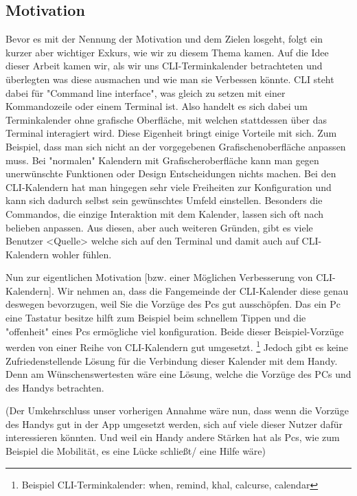 \subsection{Motivation}

Bevor es mit der Nennung der Motivation und dem Zielen losgeht, folgt ein kurzer aber wichtiger Exkurs, wie wir zu diesem Thema kamen. \newline
Auf die Idee dieser Arbeit kamen wir, als wir uns CLI-Terminkalender betrachteten und überlegten was diese ausmachen und wie man sie Verbessen könnte. CLI steht dabei für "Command line interface", was gleich zu setzen mit einer Kommandozeile oder einem Terminal ist. Also handelt es sich dabei um Terminkalender ohne grafische Oberfläche, mit welchen stattdessen über das Terminal interagiert wird. \newline
Diese Eigenheit bringt einige Vorteile mit sich. Zum Beispiel, dass man sich nicht an der vorgegebenen Grafischenoberfläche anpassen muss. Bei "normalen" Kalendern mit Grafischeroberfläche kann man gegen unerwünschte Funktionen oder Design Entscheidungen nichts machen. Bei den CLI-Kalendern hat man hingegen sehr viele Freiheiten zur Konfiguration und kann sich dadurch selbst sein gewünschtes Umfeld einstellen. Besonders die Commandos, die einzige Interaktion mit dem Kalender, lassen sich oft nach belieben anpassen. \newline
Aus diesen, aber auch weiteren Gründen, gibt es viele Benutzer <\myTodo Quelle> welche sich auf den Terminal und damit auch auf CLI-Kalendern wohler fühlen.

\myNewSection
Nun zur eigentlichen Motivation [bzw. einer Möglichen Verbesserung von CLI-Kalendern]. 
Wir nehmen an, dass die Fangemeinde der CLI-Kalender diese genau deswegen bevorzugen, weil Sie die Vorzüge des Pcs gut ausschöpfen. Das ein Pc eine Tastatur besitze hilft zum Beispiel beim schnellem Tippen und die "offenheit" eines Pcs ermögliche viel konfiguration. Beide dieser Beispiel-Vorzüge werden von einer Reihe von CLI-Kalendern gut umgesetzt.%
\footnote{Beispiel CLI-Terminkalender: when, remind, khal, calcurse, calendar \myTodo}
Jedoch gibt es keine Zufriedenstellende Lösung für die Verbindung dieser Kalender mit dem Handy. Denn am Wünschenswertesten wäre eine Lösung, welche die Vorzüge des PCs und des Handys betrachten. 

\myNewSection (\myTodo Der Umkehrschluss unser vorherigen Annahme wäre nun, dass wenn die Vorzüge des Handys gut in der App umgesetzt werden, sich auf viele dieser Nutzer dafür interessieren könnten. Und weil ein Handy andere Stärken hat als Pcs, wie zum Beispiel die Mobilität, es eine Lücke schließt/ eine Hilfe wäre)


